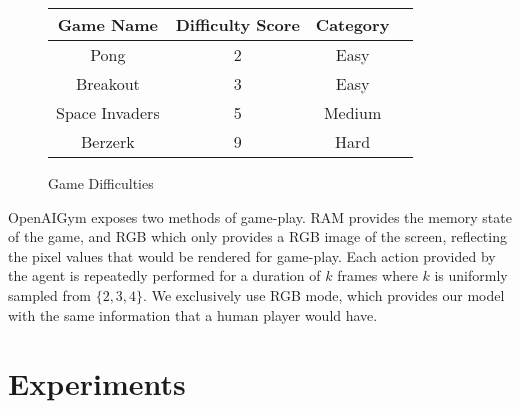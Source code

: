 \documentclass{article} %
\begin{document}
\begin{figure}[ht!] 
\centering
 \begin{tabular}{c c c c} 
 \toprule
 Game Name & Difficulty Score &Category\\ [0.5ex] 
\midrule
 Pong & 2 & Easy \\ 
 Breakout & 3 & Easy \\
 Space Invaders & 5 & Medium\\
 Berzerk & 9 & Hard\\
 \bottomrule
\end{tabular}
\label{game_difficulties}
\caption{Game Difficulties}
\end{figure}

\noindent OpenAIGym exposes two methods of game-play. RAM provides the memory state of the game, and RGB which only provides a RGB image of the screen, reflecting the pixel values that would be rendered for game-play. Each action provided by the agent is repeatedly performed for a duration of $k$ frames where $k$ is uniformly sampled from $\{2,3,4\}$. We exclusively use RGB mode, which provides our model with the same information that a human player would have.

\section{Experiments}








\nocite{*}
 


\end{document}
